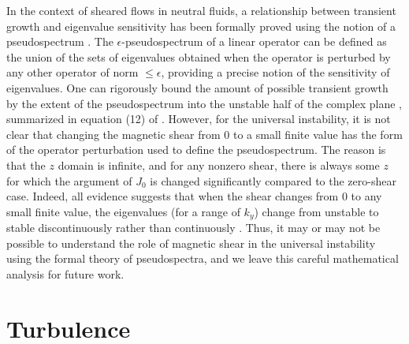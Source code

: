 \documentclass{jpp}
\let\le=\leqslant  \let\leq=\leqslant
\begin{document}
In the context of sheared flows in neutral fluids, a relationship
between transient growth and eigenvalue sensitivity has been formally
proved using the notion of a pseudospectrum
\citep{ReddyHenningson,TrefethenSubcritical,TrefethenEmbree}. The
$\epsilon$-pseudospectrum of a linear operator can be defined as the
union of the sets of eigenvalues obtained when the operator is
perturbed by any other operator of norm $\le \epsilon$, providing a
precise notion of the sensitivity of eigenvalues.  One can rigorously
bound the amount of possible transient growth by the extent of the
pseudospectrum into the unstable half of the complex plane
\citep{ReddyHenningson}, summarized in equation (12) of \citet{TrefethenSubcritical}.
However, for the universal instability, it is not clear that changing
the magnetic shear from 0 to a small finite value has the form of the
operator perturbation used to define the pseudospectrum.  The reason
is that the $z$ domain is infinite, and for any nonzero shear, there
is always some $z$ for which the argument of $J_0$ is changed
significantly compared to the zero-shear case.  Indeed, all evidence
suggests that when the shear changes from 0 to any small finite value,
the eigenvalues (for a range of $k_y$) change from unstable to stable
discontinuously rather than continuously \citep{Ross,Tsang}.  Thus, it
may or may not be possible to understand the role of magnetic shear in
the universal instability using the formal theory of pseudospectra,
and we leave this careful mathematical analysis for future work.


\section{Turbulence}
\label{sec:turbulence}
\end{document}
